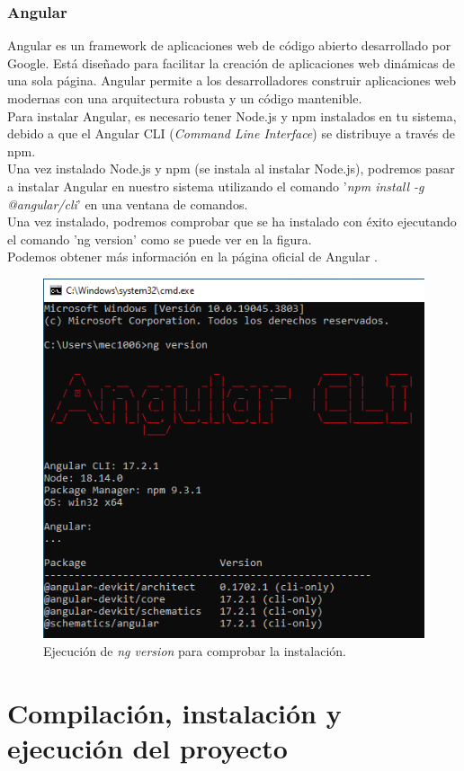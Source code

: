 \subsubsection{Angular}
Angular es un framework de aplicaciones web de código abierto desarrollado por Google. Está diseñado para facilitar la creación de aplicaciones web dinámicas de una sola página. Angular permite a los desarrolladores construir aplicaciones web modernas con una arquitectura robusta y un código mantenible. \\
Para instalar Angular, es necesario tener Node.js y npm instalados en tu sistema, debido a que el Angular CLI (\textit{Command Line Interface}) se distribuye a través de npm. \\
Una vez instalado Node.js y npm (se instala al instalar Node.js), podremos pasar a instalar Angular en nuestro sistema utilizando el comando '\textit{npm install -g @angular/cli}' en una ventana de comandos. \\
Una vez instalado, podremos comprobar que se ha instalado con éxito ejecutando el comando 'ng version' como se puede ver en la figura. \\
Podemos obtener más información en la página oficial de Angular \cite{Angular:latex}.
\begin{figure}[H]
    \centering
    \includegraphics[width=0.65\linewidth]{img/angularInstalacion.png}
    \caption{Ejecución de \textit{ng version} para comprobar la instalación.}
    \label{fig:enter-label}
\end{figure}
\section{Compilación, instalación y ejecución del proyecto}
